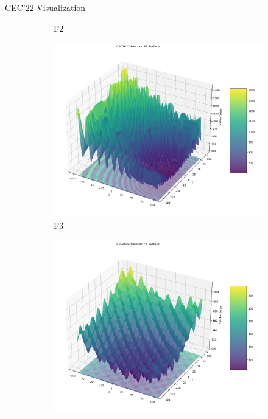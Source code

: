 \documentclass[aspectratio=169]{beamer}
\begin{document}
\begin{frame}{CEC'22 Visualization}
\begin{figure}
\begin{subfigure}[b]{0.19\textwidth}
            \caption*{F2}
        \end{subfigure}
        \hfill
        \begin{subfigure}[b]{0.19\textwidth}
            \includegraphics[width=\textwidth]{plots/cec_bench/function_surface_f3.png}
            \caption*{F3}
        \end{subfigure}
        \hfill
        \begin{subfigure}[b]{0.19\textwidth}
            \includegraphics[width=\textwidth]{plots/cec_bench/function_surface_f4.png}

\end{subfigure}
\end{figure}
\end{frame}
\end{document}

